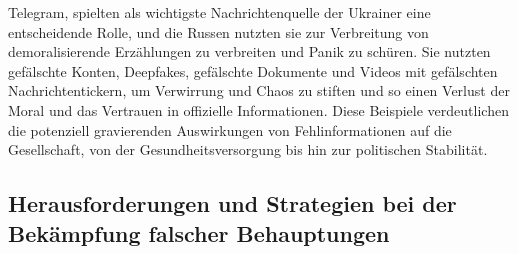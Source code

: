 \documentclass[a4paper,listof=totoc,bibliography=totoc]{scrartcl}
\begin{document}
Telegram, spielten als wichtigste Nachrichtenquelle der Ukrainer eine entscheidende Rolle, und die Russen nutzten sie zur Verbreitung von demoralisierende Erzählungen zu verbreiten 
und Panik zu schüren. Sie nutzten gefälschte Konten, Deepfakes, gefälschte Dokumente und Videos mit gefälschten Nachrichtentickern, um Verwirrung und Chaos zu stiften und so einen 
Verlust der Moral und das Vertrauen in offizielle Informationen.
\newline
\newline
Diese Beispiele verdeutlichen die potenziell gravierenden Auswirkungen von Fehlinformationen auf die Gesellschaft, von der Gesundheitsversorgung bis hin zur politischen Stabilität.

\subsection{Herausforderungen und Strategien bei der Bekämpfung falscher Behauptungen}
\end{document}
